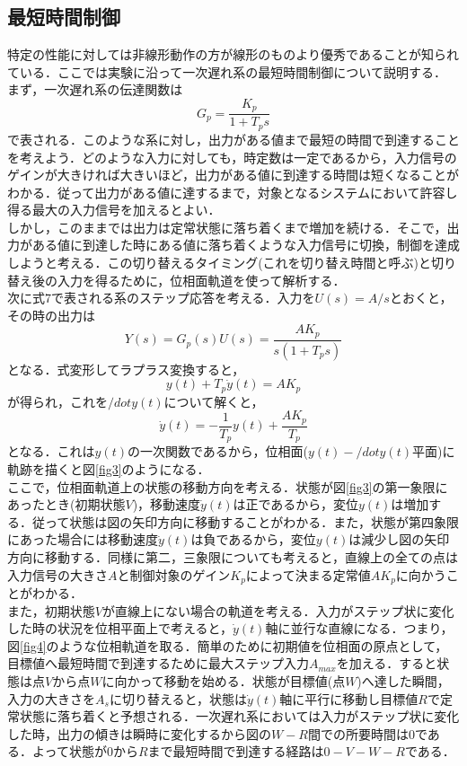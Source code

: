 \documentclass[11pt,a4paper]{jsarticle}
\begin{document}
  \subsection{最短時間制御}
  特定の性能に対しては非線形動作の方が線形のものより優秀であることが知られている．ここでは実験に沿って一次遅れ系の最短時間制御について説明する． \\
  まず，一次遅れ系の伝達関数は
  \begin{equation}
   G_p = \frac{K_p}{1 + T_p s}
  \end{equation}
  で表される．このような系に対し，出力がある値まで最短の時間で到達することを考えよう．どのような入力に対しても，時定数は一定であるから，入力信号のゲインが大きければ大きいほど，出力がある値に到達する時間は短くなることがわかる．従って出力がある値に達するまで，対象となるシステムにおいて許容し得る最大の入力信号を加えるとよい． \\
  しかし，このままでは出力は定常状態に落ち着くまで増加を続ける．そこで，出力がある値に到達した時にある値に落ち着くような入力信号に切換，制御を達成しようと考える．この切り替えるタイミング(これを切り替え時間と呼ぶ)と切り替え後の入力を得るために，位相面軌道を使って解析する．\\
  次に式7で表される系のステップ応答を考える．入力を$U(s) = A/s$とおくと，その時の出力は
  \begin{equation}
   Y(s) = G_p(s)U(s) = \frac{AK_p}{s(1 + T_p s)}
  \end{equation}
  となる．式変形してラプラス変換すると，
  \begin{equation}
   y(t) + T_p \dot y(t) = AK_p
  \end{equation}
  が得られ，これを$/dot y(t)$について解くと，
  \begin{equation}
   \dot y(t) = -\frac{1}{T_p} y(t) + \frac{AK_p}{T_p}
  \end{equation}
  となる．これは$y(t)$の一次関数であるから，位相面($y(t) - /dot y(t)$平面)に軌跡を描くと図\ref{fig3}のようになる．\\
ここで，位相面軌道上の状態の移動方向を考える．状態が図\ref{fig3}の第一象限にあったとき(初期状態$V$)，移動速度$\dot y(t)$は正であるから，変位$y(t)$は増加する．従って状態は図の矢印方向に移動することがわかる．また，状態が第四象限にあった場合には移動速度$\dot y(t)$は負であるから，変位$y(t)$は減少し図の矢印方向に移動する．同様に第二，三象限についても考えると，直線上の全ての点は入力信号の大きさ$A$と制御対象のゲイン$K_p$によって決まる定常値$AK_p$に向かうことがわかる． \\
また，初期状態$V$が直線上にない場合の軌道を考える．入力がステップ状に変化した時の状況を位相平面上で考えると，$\dot y(t)$軸に並行な直線になる．つまり，図\ref{fig4}のような位相軌道を取る．簡単のために初期値を位相面の原点として，目標値へ最短時間で到達するために最大ステップ入力$A_{max}$を加える．すると状態は点$V$から点$W$に向かって移動を始める．状態が目標値(点$W$)へ達した瞬間，入力の大きさを$A_s$に切り替えると，状態は$\dot y(t)$軸に平行に移動し目標値$R$で定常状態に落ち着くと予想される．一次遅れ系においては入力がステップ状に変化した時，出力の傾きは瞬時に変化するから図の$W-R$間での所要時間は$0$である．よって状態が$0$から$R$まで最短時間で到達する経路は$0-V-W-R$である． \\
\end{document}
